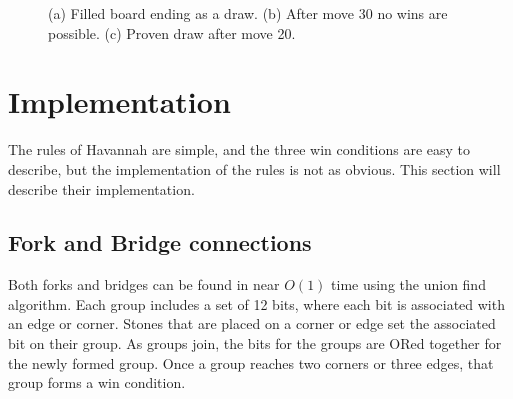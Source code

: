 \begin{figure}
	\centering
	\subfloat[]{\label{fig:drawproven}
		\begin{HavannahBoard}[board size=4,coordinate style=classical,show coordinates=false]
		\HGame{g7,a1,f5,g4,e3,d2,e2,d1,c2,d3,c3,f7,d6,b4,a4,b5,a3,e5,c4,b3}%
		\end{HavannahBoard}
	}
	\caption{(a) Filled board ending as a draw. (b) After move 30 no wins are possible. (c) Proven draw after move 20.}
	\label{fig:draw}
\end{figure}




\section{Implementation}

The rules of Havannah are simple, and the three win conditions are easy to describe, but the implementation of the rules is not as obvious. This section will describe their implementation.

\subsection{Fork and Bridge connections}

Both forks and bridges can be found in near $O(1)$ time using the union find algorithm. Each group includes a set of 12 bits, where each bit is associated with an edge or corner. Stones that are placed on a corner or edge set the associated bit on their group. As groups join, the bits for the groups are ORed together for the newly formed group. Once a group reaches two corners or three edges, that group forms a win condition.

